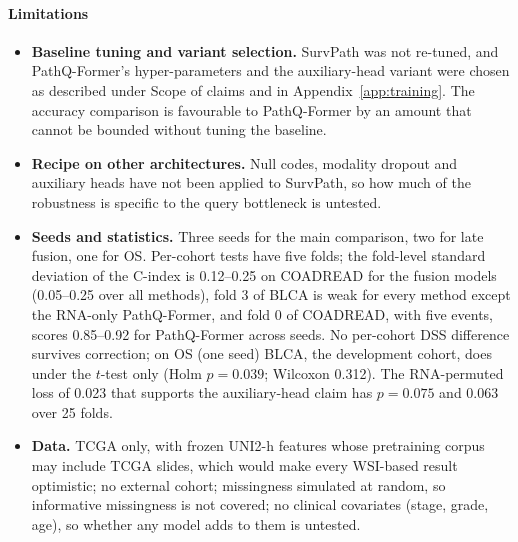 \documentclass{article}
\newcommand{\pq}{PathQ-Former}
\newcommand{\cindex}{C-index}
\begin{document}
\paragraph{Limitations}
\begin{itemize}
\item \textbf{Baseline tuning and variant selection.} SurvPath was not re-tuned, and \pq{}'s hyper-parameters and the auxiliary-head variant were chosen as described under Scope of claims and in Appendix~\ref{app:training}. The accuracy comparison is favourable to \pq{} by an amount that cannot be bounded without tuning the baseline.
\item \textbf{Recipe on other architectures.} Null codes, modality dropout and auxiliary heads have not been applied to SurvPath, so how much of the robustness is specific to the query bottleneck is untested.
\item \textbf{Seeds and statistics.} Three seeds for the main comparison, two for late fusion, one for OS. Per-cohort tests have five folds; the fold-level standard deviation of the \cindex{} is 0.12--0.25 on COADREAD for the fusion models (0.05--0.25 over all methods), fold 3 of BLCA is weak for every method except the RNA-only \pq{}, and fold 0 of COADREAD, with five events, scores 0.85--0.92 for \pq{} across seeds. No per-cohort DSS difference survives correction; on OS (one seed) BLCA, the development cohort, does under the $t$-test only (Holm $p = 0.039$; Wilcoxon 0.312). The RNA-permuted loss of 0.023 that supports the auxiliary-head claim has $p = 0.075$ and $0.063$ over 25 folds.
\item \textbf{Data.} TCGA only, with frozen UNI2-h features whose pretraining corpus may include TCGA slides, which would make every WSI-based result optimistic; no external cohort; missingness simulated at random, so informative missingness is not covered; no clinical covariates (stage, grade, age), so whether any model adds to them is untested.
\end{itemize}
\end{document}
